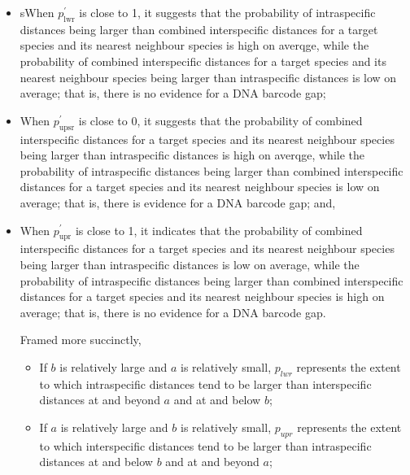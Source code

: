 \documentclass[12pt]{article}
\begin{document}
\begin{itemize}
\vspace{1mm}

\item sWhen  $p^{'}_\mathrm{lwr}$ is close to 1, it suggests that the probability of intraspecific distances being larger than combined interspecific distances for a target species and its nearest neighbour species is high on averqge, while the probability of combined interspecific distances for a target species and its nearest neighbour species being larger than intraspecific distances is low on average; that is, there is no evidence for a DNA barcode gap;

\vspace{1mm}

\item When $p^{'}_\mathrm{upsr}$ is close to 0, it suggests that the probability of combined interspecific distances for a target species and its nearest neighbour species being larger than intraspecific distances is high on averqge, while the probability of intraspecific distances being larger than combined interspecific distances for a target species and its nearest neighbour species is low on average; that is, there is evidence for a DNA barcode gap; and,

\vspace{1mm}

\item When $p^{'}_\mathrm{upr}$ is close to 1, it indicates that the probability of combined interspecific distances for a target species and its nearest neighbour species being larger than intraspecific distances is low on average, while the probability of intraspecific distances being larger than combined interspecific distances for a target species and its nearest neighbour species is high on average; that is, there is no evidence for a DNA barcode gap.

Framed more succinctly, 

\begin{itemize}

\item If $b$ is relatively large and $a$ is relatively small, $p_{lwr}$ represents the extent to which intraspecific distances tend to be larger than interspecific distances at and beyond $a$ and at and below $b$;

\vspace{1mm}

\item If $a$ is relatively large and $b$ is relatively small, $p_{upr}$ represents the extent to which interspecific distances tend to be larger than intraspecific distances at and below $b$ and at and beyond $a$;


\end{itemize}
\end{itemize}
\end{document}
